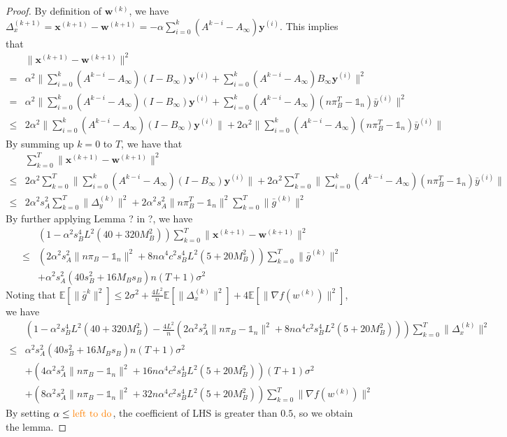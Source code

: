 \documentclass{article}
\newcommand{\vw}{{\mathbf{w}}}
\newcommand{\vx}{{\mathbf{x}}}
\newcommand{\vy}{{\mathbf{y}}}
\newcommand{\EE}[1]{\mathbb{E}\left[#1\right]}
\newcommand{\norm}[1]{\| #1 \|}
\newcommand{\one}{\mathds{1}_n}
\begin{document}
\begin{proof}
By definition of $\vw^{(k)}$, we have $\Delta_{x}^{(k+1)}=\vx^{(k+1)}-\vw^{(k+1)}=-\alpha\sum_{i=0}^k(A^{k-i}-A_{\infty})\vy^{(i)}$. This implies that
\begin{align*}
&\norm{\vx^{(k+1)}-\vw^{(k+1)}}^2\\ 
=&\alpha^2 \norm{\sum_{i=0}^k(A^{k-i}-A_{\infty})(I-B_{\infty})\vy^{(i)}+\sum_{i=0}^k(A^{k-i}-A_{\infty})B_{\infty}\vy^{(i)}}^2\\ 
=&\alpha^2 \norm{\sum_{i=0}^k(A^{k-i}-A_{\infty})(I-B_{\infty})\vy^{(i)}+\sum_{i=0}^k(A^{k-i}-A_{\infty})(n\pi_{B}^T-\one)\bar{y}^{(i)}}^2\\ 
\leq&2\alpha^2\norm{\sum_{i=0}^k(A^{k-i}-A_{\infty})(I-B_{\infty})\vy^{(i)}}+2\alpha^2\norm{\sum_{i=0}^k(A^{k-i}-A_{\infty})(n\pi_{B}^T-\one)\bar{y}^{(i)}}
\end{align*}
By summing up $k=0$ to $T$, we have that
\begin{align*}
&\sum_{k=0}^T\norm{\vx^{(k+1)}-\vw^{(k+1)}}^2\\ 
\leq& 2\alpha^2\sum_{k=0}^T\norm{\sum_{i=0}^k(A^{k-i}-A_{\infty})(I-B_{\infty})\vy^{(i)}}+2\alpha^2\sum_{k=0}^T\norm{\sum_{i=0}^k(A^{k-i}-A_{\infty})(n\pi_{B}^T-\one)\bar{y}^{(i)}}\\ 
\leq& 2\alpha^2s_{A}^2\sum_{k=0}^T \norm{\Delta_{y}^{(k)}}^2+2\alpha^2s_{A}^2\norm{n\pi_{B}^T-\one}^2\sum_{k=0}^T\norm{\bar{g}^{(k)}}^2
\end{align*}
By further applying Lemma ? in ?, we have
\begin{align*}
  &\left(1-\alpha^2s_B^4L^2(40+320M_B^2)\right)\sum_{k=0}^T\norm{\vx^{(k+1)}-\vw^{(k+1)}}^2\\ 
  \leq &\left(2\alpha^2s_A^2\norm{n\pi_B-\one}^2+8n\alpha^4c^2s_B^4L^2(5+20M_B^2)\right) \sum_{k=0}^T\norm{\bar{g}^{(k)}}^2\\ &+\alpha^2s_A^2(40s_B^2+16M_Bs_B)n (T+1)\sigma^2
\end{align*}
Noting that $\EE{\norm{\bar{g}^{k}}^2}\leq 2\sigma^2+\frac{4L^2}{n}\EE{\norm{\Delta_x^{(k)}}^2}+4\EE{\norm{\nabla f(w^{(k)})}^2}$, we have
\begin{align*}
  &\left(1-\alpha^2s_B^4L^2(40+320M_B^2)-\frac{4L^2}{n}\left(2\alpha^2s_A^2\norm{n\pi_B-\one}^2+8n\alpha^4c^2s_B^4L^2(5+20M_B^2)\right)\right)\sum_{k=0}^T\norm{\Delta_x^{(k)}}^2\\ 
  \leq &\alpha^2s_A^2(40s_B^2+16M_Bs_B)n (T+1)\sigma^2\\&+\left(4\alpha^2s_A^2\norm{n\pi_B-\one}^2+16n\alpha^4c^2s_B^4L^2(5+20M_B^2)\right)(T+1)\sigma^2\\&+\left(8\alpha^2s_A^2\norm{n\pi_B-\one}^2+32n\alpha^4c^2s_B^4L^2(5+20M_B^2)\right) \sum_{k=0}^T\norm{\nabla f(w^{(k)})}^2
\end{align*}
By setting $\alpha \leq \textcolor{orange}{\text{left to do}}$, the coefficient of LHS is greater than $0.5$, so we obtain the lemma.
\end{proof}
\end{document}
